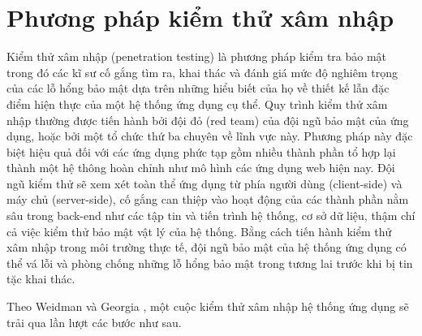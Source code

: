 \section{Phương pháp kiểm thử xâm nhập}
Kiểm thử xâm nhập (penetration testing) \parencite{vimpari2015evaluation} là phương pháp kiểm tra bảo mật trong đó các kĩ sư cố gắng tìm ra, khai thác và đánh giá mức độ nghiêm trọng của các lỗ hổng bảo mật dựa trên những hiểu biết của họ về thiết kế lẫn đặc điểm hiện thực của một hệ thống ứng dụng cụ thể. Quy trình kiểm thử xâm nhập thường được tiến hành bởi đội đỏ (red team) của đội ngũ bảo mật của ứng dụng, hoặc bởi một tổ chức thứ ba chuyên về lĩnh vực này. Phương pháp này đặc biệt hiệu quả đối với các ứng dụng phức tạp gồm nhiều thành phần tổ hợp lại thành một hệ thông hoàn chỉnh như mô hình các ứng dụng web hiện nay. Đội ngũ kiểm thử sẽ xem xét toàn thể ứng dụng từ phía người dùng (client-side) và máy chủ (server-side), cố gắng can thiệp vào hoạt động của các thành phần nằm sâu trong back-end như các tập tin và tiến trình hệ thống, cơ sở dữ liệu, thậm chí cả việc kiểm thử bảo mật vật lý của hệ thống. Bằng cách tiến hành kiểm thử xâm nhập trong môi trường thực tế, đội ngũ bảo mật của hệ thống ứng dụng có thể vá lỗi và phòng chống những lỗ hổng bảo mật trong tương lai trước khi bị tin tặc khai thác.\par
Theo Weidman và Georgia \parencite{weidman2014penetration}, một cuộc kiểm thử xâm nhập hệ thống ứng dụng sẽ trải qua lần lượt các bước như sau.
